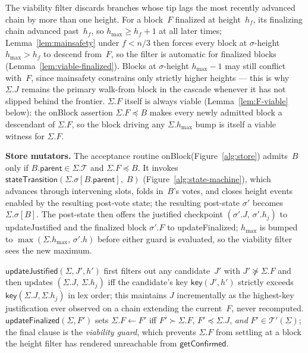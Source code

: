 \ifx\litemode\undefined\documentclass{article}\fi
\newcommand{\T}[0]{\ensuremath{\mathcal{T}}}
\newcommand{\parent}{\mathsf{parent}}
\newcommand{\hmax}{\ensuremath{h_{\max}}\xspace}
\newcommand{\viableTree}{\ensuremath{\mathcal{T}'}}
\newcommand{\stateTransition}{\textsf{stateTransition}\xspace}
\newcommand{\onBlock}{\textsf{onBlock}\xspace}
\newcommand{\updateJustified}{\textsf{updateJustified}\xspace}
\newcommand{\updateFinalized}{\textsf{updateFinalized}\xspace}
\newcommand{\getConfirmed}{\textsf{getConfirmed}\xspace}
\newcommand{\key}{\ensuremath{\mathsf{key}}}
\renewcommand{\paragraph}[1]{\vspace{7pt}\noindent\textbf{#1}}
\theoremstyle{plain}
\theoremstyle{definition}
\theoremstyle{remark}
\begin{document}
The viability filter discards branches whose tip lags the most recently advanced chain by more than one height.
For a block~$F$ finalized at height~$h_f$, its finalizing chain advanced past~$h_f$, so $\hmax \geq h_f + 1$ at all later times; Lemma~\ref{lem:mainsafety} under $f < n/3$ then forces every block at $\sigma$-height~$\hmax > h_f$ to descend from~$F$, so the filter is automatic for finalized blocks (Lemma~\ref{lem:viable-finalized}).
Blocks at $\sigma$-height $\hmax - 1$ may still conflict with~$F$, since mainsafety constrains only strictly higher heights --- this is why $\Sigma.J$ remains the primary walk-from block in the cascade whenever it has not slipped behind the frontier.
$\Sigma.F$ itself is always viable (Lemma~\ref{lem:F-viable} below): the \onBlock assertion $\Sigma.F \preceq B$ makes every newly admitted block a descendant of $\Sigma.F$, so the block driving any $\Sigma.\hmax$ bump is itself a viable witness for $\Sigma.F$.

\paragraph{Store mutators.}
The acceptance routine \onBlock (Figure~\ref{alg:store}) admits~$B$ only if $B.\parent \in \Sigma.\T$ and $\Sigma.F \preceq B$.
It invokes $\stateTransition(\Sigma.\sigma[B.\parent],\; B)$ (Figure~\ref{alg:state-machine}), which advances through intervening slots, folds in~$B$'s votes, and closes height events enabled by the resulting post-vote state; the resulting post-state $\sigma'$ becomes $\Sigma.\sigma[B]$.
The post-state then offers the justified checkpoint $(\sigma'.J,\, \sigma'.h_j)$ to \updateJustified and the finalized block $\sigma'.F$ to \updateFinalized; $\hmax$ is bumped to $\max(\Sigma.\hmax,\, \sigma'.h)$ before either guard is evaluated, so the viability filter sees the new maximum.

$\updateJustified(\Sigma, J', h')$ first filters out any candidate~$J'$ with $J' \not\succeq \Sigma.F$ and then updates $(\Sigma.J,\, \Sigma.h_j)$ iff the candidate's key $\key(J', h')$ strictly exceeds $\key(\Sigma.J, \Sigma.h_j)$ in lex order; this maintains $J$ incrementally as the highest-key justification ever observed on a chain extending the current~$F$, never recomputed.
$\updateFinalized(\Sigma, F')$ sets $\Sigma.F \gets F'$ iff $F' \succ \Sigma.F$, $F' \preceq \Sigma.J$, \emph{and} $F' \in \viableTree(\Sigma)$; the final clause is the \emph{viability guard}, which prevents $\Sigma.F$ from settling at a block the height filter has rendered unreachable from $\getConfirmed$.
\end{document}
